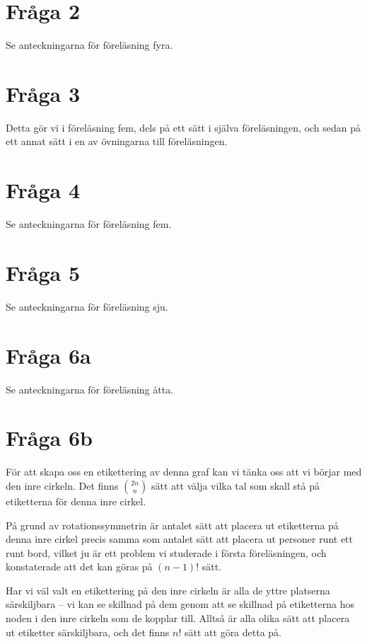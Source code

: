 \documentclass[nobib]{tufte-handout}
\begin{document}
\section{Fråga 2}

Se anteckningarna för föreläsning fyra.

\section{Fråga 3}

Detta gör vi i föreläsning fem, dels på ett sätt i själva föreläsningen, och sedan på ett annat sätt i en av övningarna till föreläsningen.

\section{Fråga 4}

Se anteckningarna för föreläsning fem.

\section{Fråga 5}

Se anteckningarna för föreläsning sju.

\section{Fråga 6a}

Se anteckningarna för föreläsning åtta.

\section{Fråga 6b}

För att skapa oss en etikettering av denna graf kan vi tänka oss att vi börjar med den inre cirkeln. Det finns $\binom{2n}{n}$ sätt att välja vilka tal som skall stå på etiketterna för denna inre cirkel.

På grund av rotationssymmetrin är antalet sätt att placera ut etiketterna på denna inre cirkel precis samma som antalet sätt att placera ut personer runt ett runt bord, vilket ju är ett problem vi studerade i första föreläsningen, och konstaterade att det kan göras på $(n-1)!$ sätt.

Har vi väl valt en etikettering på den inre cirkeln är alla de yttre platserna särskiljbara -- vi kan se skillnad på dem genom att se skillnad på etiketterna hos noden i den inre cirkeln som de kopplar till. Alltså är alla olika sätt att placera ut etiketter särskiljbara, och det finns $n!$ sätt att göra detta på.
\end{document}
